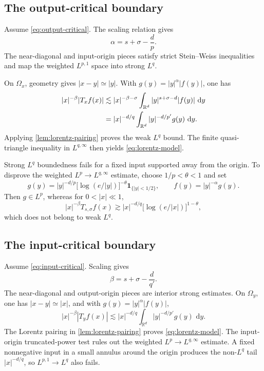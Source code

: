 \documentclass[11pt]{amsart}
\numberwithin{equation}{section}
\theoremstyle{plain}
\theoremstyle{definition}
\theoremstyle{remark}
\newcommand{\RR}{\mathbb{R}}
\newcommand{\dd}{\,\mathrm{d}}
\newcommand{\one}{\mathbf{1}}
\begin{document}
\subsection{The output-critical boundary}

Assume \cref{eq:output-critical}. The scaling relation gives
\begin{equation}
 \alpha=s+\sigma-\frac d p.
 \label{eq:alpha-output-critical}
\end{equation}
The near-diagonal and input-origin pieces satisfy strict Stein--Weiss inequalities and map the weighted $L^{p,1}$ space into strong $L^q$.

On $\Omega_x$, geometry gives $|x-y|\simeq |y|$. With $g(y)=|y|^\alpha|f(y)|$, one has
\begin{align}
 |x|^{-\beta}|T_xf(x)|
 &\lesssim |x|^{-\beta-\sigma}
 \int_{\RR^d}|y|^{s+\sigma-d}|f(y)|\,\dd y
 \notag\\
 &=|x|^{-d/q}
 \int_{\RR^d}|y|^{-d/p'}g(y)\,\dd y.
 \label{eq:output-critical-piece}
\end{align}
Applying \cref{lem:lorentz-pairing} proves the weak $L^q$ bound. The finite quasi-triangle inequality in $L^{q,\infty}$ then yields \cref{eq:lorentz-model}.

Strong $L^q$ boundedness fails for a fixed input supported away from the origin. To disprove the weighted $L^p\to L^{q,\infty}$ estimate, choose $1/p<\theta<1$ and set
\begin{equation}
 g(y)
 =|y|^{-d/p}\bigl[\log(e/|y|)\bigr]^{-\theta}
 \one_{\{|y|<1/2\}},
 \qquad
 f(y)=|y|^{-\alpha}g(y).
 \label{eq:output-critical-counterexample}
\end{equation}
Then $g\in L^p$, whereas for $0<|x|\ll1$,
\begin{equation}
 |x|^{-\beta}T_{s,\sigma}f(x)
 \gtrsim
 |x|^{-d/q}\bigl[\log(e/|x|)\bigr]^{1-\theta},
 \label{eq:output-critical-counterexample-lower}
\end{equation}
which does not belong to weak $L^q$.

\subsection{The input-critical boundary}

Assume \cref{eq:input-critical}. Scaling gives
\begin{equation}
 \beta=s+\sigma-\frac d{q'}.
 \label{eq:beta-input-critical}
\end{equation}
The near-diagonal and output-origin pieces are interior strong estimates. On $\Omega_y$, one has $|x-y|\simeq |x|$, and with $g(y)=|y|^\alpha|f(y)|$,
\begin{equation}
 |x|^{-\beta}|T_yf(x)|
 \lesssim
 |x|^{-d/q}
 \int_{\RR^d}|y|^{-d/p'}g(y)\,\dd y.
 \label{eq:input-critical-piece}
\end{equation}
The Lorentz pairing in \cref{lem:lorentz-pairing} proves \cref{eq:lorentz-model}. The input-origin truncated-power test rules out the weighted $L^p\to L^{q,\infty}$ estimate. A fixed nonnegative input in a small annulus around the origin produces the non-$L^q$ tail $|x|^{-d/q}$, so $L^{p,1}\to L^q$ also fails.
\end{document}
